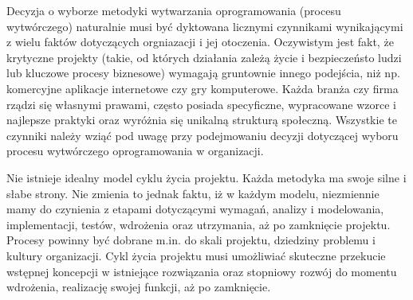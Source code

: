       Decyzja o wyborze metodyki wytwarzania oprogramowania (procesu wytwórczego) naturalnie musi być dyktowana licznymi czynnikami wynikającymi z wielu faktów dotyczących orgniazacji i jej otoczenia. Oczywistym jest fakt, że krytyczne projekty (takie, od których działania zależą życie i bezpieczeństo ludzi lub kluczowe procesy biznesowe) wymagają gruntownie innego podejścia, niż np. komercyjne aplikacje internetowe czy gry komputerowe. Każda branża czy firma rządzi się własnymi prawami, często posiada specyficzne, wypracowane wzorce i najlepsze praktyki oraz wyróżnia się unikalną strukturą społeczną. Wszystkie te czynniki należy wziąć pod uwagę przy podejmowaniu decyzji dotyczącej wyboru procesu wytwórczego oprogramowania w organizacji.

      Nie istnieje idealny model cyklu życia projektu. Każda metodyka ma swoje silne i słabe strony. Nie zmienia to jednak faktu, iż w każdym modelu, niezmiennie mamy do czynienia z etapami dotyczącymi wymagań, analizy i modelowania, implementacji, testów, wdrożenia oraz utrzymania, aż po zamknięcie projektu. Procesy powinny być dobrane m.in. do skali projektu, dziedziny problemu i kultury organizacji. Cykl życia projektu musi umożliwiać skuteczne przekucie wstępnej koncepcji w istniejące rozwiązania oraz stopniowy rozwój do momentu wdrożenia, realizację swojej funkcji, aż po zamknięcie. \cite{Brooks87}

